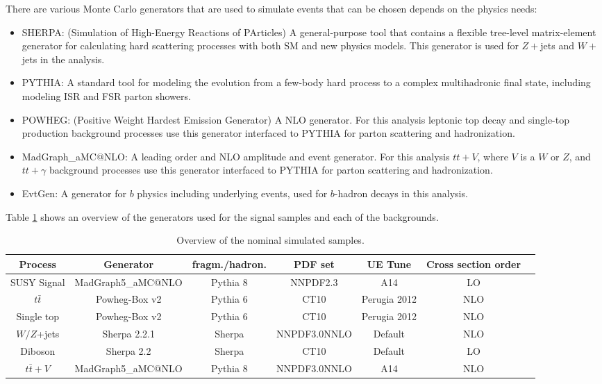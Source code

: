 There are various Monte Carlo generators that are used to simulate events that can be chosen depends on the physics needs:

\begin{itemize}
	\item SHERPA\cite{sherpa}:  (Simulation of High-Energy Reactions of PArticles) A general-purpose tool that contains a flexible tree-level matrix-element generator for calculating hard scattering processes with both SM and new physics models.  This generator is used for $Z+$jets and $W+$jets in the analysis.
	\item PYTHIA\cite{pythia8}: A standard tool for modeling the evolution from a few-body hard process to a complex multihadronic final state, including modeling ISR and FSR parton showers.
	\item POWHEG\cite{powheg-box}: (Positive Weight Hardest Emission Generator) A NLO generator.  For this analysis leptonic top decay and single-top production background processes use this generator interfaced to PYTHIA for parton scattering and hadronization.  
	\item MadGraph\_aMC@NLO\cite{madgraph}: A leading order and NLO amplitude and event generator.  For this analysis $tt+V$, where $V$ is a $W$ or $Z$, and $tt+\gamma$ background processes use this generator interfaced to PYTHIA for parton scattering and hadronization.  
	\item EvtGen\cite{evtGen}: A generator for $b$ physics including underlying events, used for $b$-hadron decays in this analysis.
\end{itemize}

Table \ref{tab:mc_samples1} shows an overview of the generators used for the signal samples and each of the backgrounds. \\

\begin{table}[htpb]
  \centering
  \tiny
    \caption{Overview of the nominal simulated samples. }
  \begin{tabular}{ccccccc}
    Process & Generator & fragm./hadron. & PDF set  & UE Tune & Cross section order\\
    \hline 
    \hline
    SUSY Signal & {\sc MadGraph5\_aMC\/@NLO} & {\sc Pythia} 8 & NNPDF2.3 & A14 & LO  & \\ 
    $t\bar{t}$ & {\sc Powheg-Box} v2 & {\sc Pythia} 6 & CT10  & {\sc Perugia 2012} & NLO & \\ 
    Single top & {\sc Powheg-Box} v2 & {\sc Pythia} 6 & CT10  & {\sc Perugia 2012} & NLO & \\ 
    $W/Z$+jets & {\sc Sherpa} 2.2.1 & {\sc Sherpa}  & NNPDF3.0NNLO & Default & NLO & \\ 
    Diboson & {\sc Sherpa} 2.2 & {\sc Sherpa} & CT10 & Default & LO\\ 
    $t\bar{t}+V$ & {\sc MadGraph5\_aMC\/@NLO} & {\sc Pythia} 8 & NNPDF3.0NNLO & A14 & NLO \\ 
    \hline
    \hline
  \end{tabular}
  \label{tab:mc_samples1}
\end{table}

